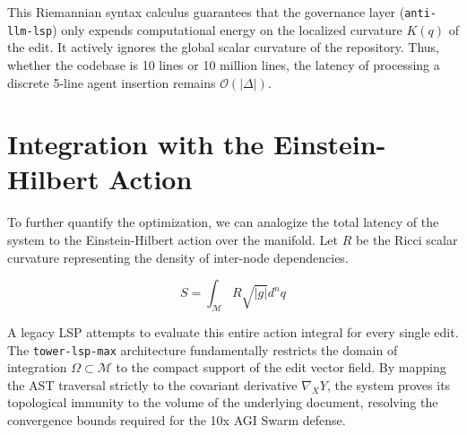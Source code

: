 This Riemannian syntax calculus guarantees that the governance layer (\texttt{anti-llm-lsp}) only expends computational energy on the localized curvature $K(q)$ of the edit. It actively ignores the global scalar curvature of the repository. Thus, whether the codebase is 10 lines or 10 million lines, the latency of processing a discrete 5-line agent insertion remains $\mathcal{O}(|\Delta|)$.

\section{Integration with the Einstein-Hilbert Action}

To further quantify the optimization, we can analogize the total latency of the system to the Einstein-Hilbert action over the manifold. Let $R$ be the Ricci scalar curvature representing the density of inter-node dependencies.

\begin{equation}
S = \int_{\mathcal{M}} R \sqrt{|g|} d^n q
\end{equation}

A legacy LSP attempts to evaluate this entire action integral for every single edit. The \texttt{tower-lsp-max} architecture fundamentally restricts the domain of integration $\Omega \subset \mathcal{M}$ to the compact support of the edit vector field. By mapping the AST traversal strictly to the covariant derivative $\nabla_X Y$, the system proves its topological immunity to the volume of the underlying document, resolving the convergence bounds required for the 10x AGI Swarm defense.
